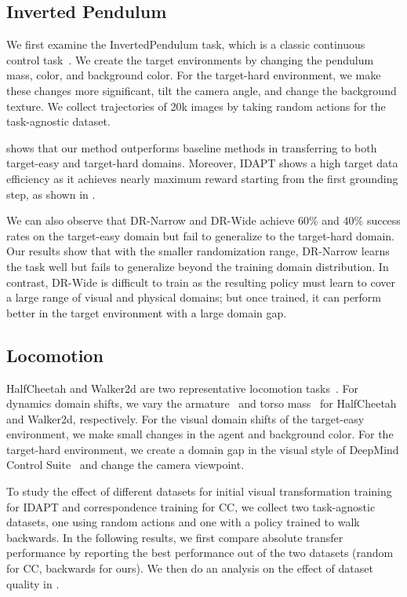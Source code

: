 \subsection{Inverted Pendulum}

We first examine the InvertedPendulum task, which is a classic continuous control task~\citep{brockman2016openai}. We create the target environments by changing the pendulum mass,  color, and background color. For the target-hard environment, we make these changes more significant, tilt the camera angle, and change the background texture. We collect trajectories of 20k images by taking random actions for the task-agnostic dataset.

 shows that our method outperforms baseline methods in transferring to both target-easy and target-hard domains. Moreover, IDAPT shows a high target data efficiency as it achieves nearly maximum reward starting from the first grounding step, as shown in . 

We can also observe that DR-Narrow and DR-Wide achieve 60\% and 40\% success rates on the target-easy domain but fail to generalize to the target-hard domain.  Our results show that with the smaller randomization range, DR-Narrow learns the task well but fails to generalize beyond the training domain distribution. In contrast, DR-Wide is difficult to train as the resulting policy must learn to cover a large range of visual and physical domains; but once trained, it can perform better in the target environment with a large domain gap.


\subsection{Locomotion}

HalfCheetah and Walker2d are two representative locomotion tasks~\citep{brockman2016openai}. For dynamics domain shifts, we vary the armature~\citep{zhang2021learning} and torso mass~\citep{desai2020imitation} for HalfCheetah and Walker2d, respectively. For the visual domain shifts of the target-easy environment, we make small changes in the agent and background color. For the target-hard environment, we create a domain gap in the visual style of DeepMind Control Suite~\citep{tassa2018deepmind} and change the camera viewpoint.

To study the effect of different datasets for initial visual transformation training for IDAPT and correspondence training for CC, we collect two task-agnostic datasets, one using random actions and one with a policy trained to walk backwards. In the following results, we first compare absolute transfer performance by reporting the best performance out of the two datasets (random for CC, backwards for ours).  We then do an analysis on the effect of dataset quality in .

